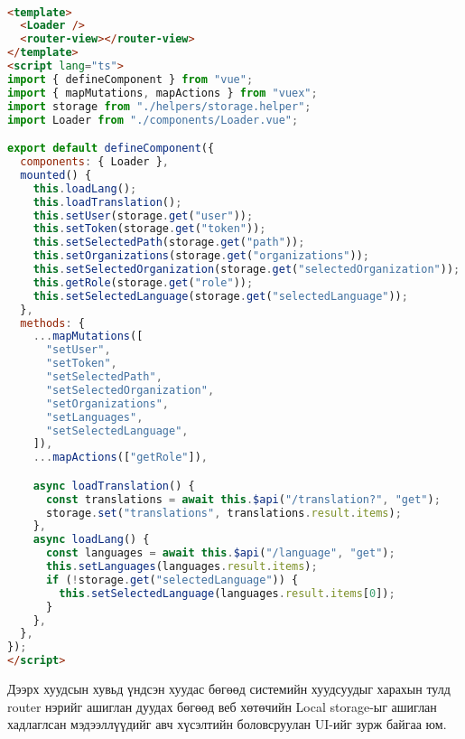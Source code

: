 \\ 
\begin{lstlisting}[language=HTML, caption=Үндсэн хуудас, frame=single]
<template>
  <Loader />
  <router-view></router-view>
</template>
<script lang="ts">
import { defineComponent } from "vue";
import { mapMutations, mapActions } from "vuex";
import storage from "./helpers/storage.helper";
import Loader from "./components/Loader.vue";

export default defineComponent({
  components: { Loader },
  mounted() {
    this.loadLang();
    this.loadTranslation();
    this.setUser(storage.get("user"));
    this.setToken(storage.get("token"));
    this.setSelectedPath(storage.get("path"));
    this.setOrganizations(storage.get("organizations"));
    this.setSelectedOrganization(storage.get("selectedOrganization"));
    this.getRole(storage.get("role"));
    this.setSelectedLanguage(storage.get("selectedLanguage"));
  },
  methods: {
    ...mapMutations([
      "setUser",
      "setToken",
      "setSelectedPath",
      "setSelectedOrganization",
      "setOrganizations",
      "setLanguages",
      "setSelectedLanguage",
    ]),
    ...mapActions(["getRole"]),

    async loadTranslation() {
      const translations = await this.$api("/translation?", "get");
      storage.set("translations", translations.result.items);
    },
    async loadLang() {
      const languages = await this.$api("/language", "get");
      this.setLanguages(languages.result.items);
      if (!storage.get("selectedLanguage")) {
        this.setSelectedLanguage(languages.result.items[0]);
      }
    },
  },
});
</script>

\end{lstlisting}
Дээрх хуудсын хувьд үндсэн хуудас бөгөөд системийн хуудсуудыг харахын тулд router нэрийг ашиглан дуудах бөгөөд веб хөтөчийн Local storage-ыг ашиглан хадлаглсан мэдээллүүдийг авч хүсэлтийн боловсруулан UI-ийг зурж байгаа юм.
\\
